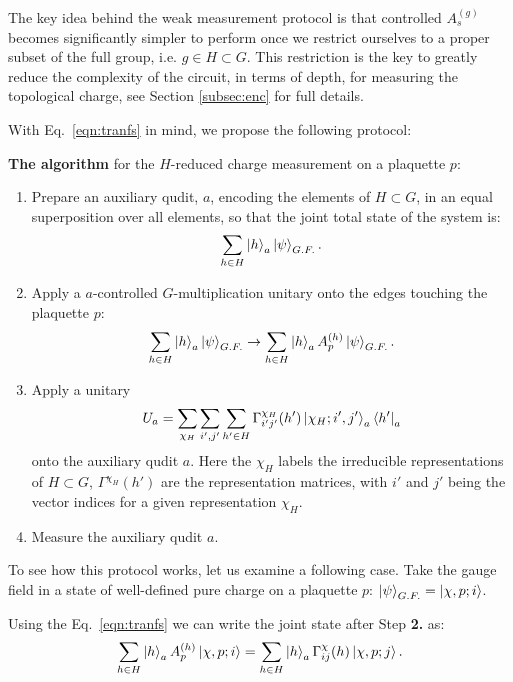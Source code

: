 \documentclass[two column]{article}
\newcommand{\caro}[1]{\textcolor{red}{[#1]}}
\begin{document}
The key idea behind the weak measurement protocol is that controlled $A_s^{(g)}$ becomes significantly simpler to perform once we restrict ourselves to a proper subset of the full group, i.e. $g \in H \subset G$.
This restriction is the key to greatly reduce the complexity of the circuit, in terms of depth, for measuring the topological charge,
see Section \ref{subsec:enc} for full details.

With Eq.~\eqref{eqn:tranfs} in mind, we propose the following protocol:

\textbf{The algorithm} for the $H$-reduced charge measurement on a plaquette $p$:\begin{enumerate}
    \item Prepare an auxiliary qudit, $a$, encoding the elements of $H\subset G$, in an equal superposition over all elements, so that the joint total state of the system is: $$ \sum_{h \in H} \ket{h}_a\ket{\psi}_{G.F.}. $$
    \item Apply a $a$-controlled $G$-multiplication unitary onto the edges touching the plaquette $p$:$$ \sum_{h \in H} \ket{h}_a\ket{\psi}_{G.F.} \rightarrow \sum_{h \in H} \ket{h}_a A^{(h)}_p \ket{\psi}_{G.F.}. $$
    \item Apply a unitary $$ U_a = \sum_{\chi_H}\sum_{i', j'}\sum_{h'\in H}  \Gamma^{\chi_H}_{i'j'}(h')  \ket{\chi_H; i', j'}_a\bra{h'}_a $$ onto the auxiliary qudit $a$. Here the $\chi_H$ labels the irreducible representations of $H \subset G$, $\Gamma^{\chi_H}(h')$ are the representation matrices, with $i'$ and $j'$ being the vector indices for a given representation $\chi_H$.
    \item Measure the auxiliary qudit $a$.
\end{enumerate}

To see how this protocol works, let us examine a following case.
Take the gauge field in a state of well-defined pure charge on a plaquette $p$: $\ket{\psi}_{G.F.} = \ket{\chi, p; i}$.

Using the Eq.~\eqref{eqn:tranfs} we can write the joint state after Step \textbf{2.} as:
\begin{equation}
    \sum_{h \in H} \ket{h}_a A^{(h)}_p \ket{\chi, p; i} = \sum_{h \in H} \ket{h}_a \Gamma^{\chi}_{ij}(h) \ket{\chi, p; j}.
\end{equation}
\end{document}
